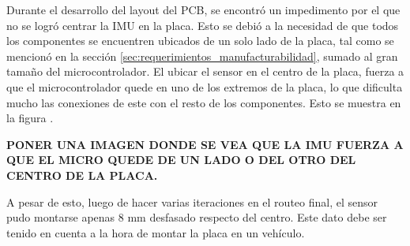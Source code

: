 
Durante el desarrollo del layout del PCB, se encontró un impedimento por el que no se logró centrar la IMU en la placa. Esto se debió a la necesidad de que todos los componentes se encuentren ubicados de un solo lado de la placa, tal como se mencionó en la sección \ref{sec:requerimientos_manufacturabilidad}, sumado al gran tamaño del microcontrolador. El ubicar el sensor en el centro de la placa, fuerza a que el microcontrolador quede en uno de los extremos de la placa, lo que dificulta mucho las conexiones de este con el resto de los componentes. Esto se muestra en la figura .

\textbf{{\color{red} PONER UNA IMAGEN DONDE SE VEA QUE LA IMU FUERZA A QUE EL MICRO QUEDE DE UN LADO O DEL OTRO DEL CENTRO DE LA PLACA.}}

A pesar de esto, luego de hacer varias iteraciones en el routeo final, el sensor pudo montarse apenas 8 mm desfasado respecto del centro. Este dato debe ser tenido en cuenta a la hora de montar la placa en un vehículo.






